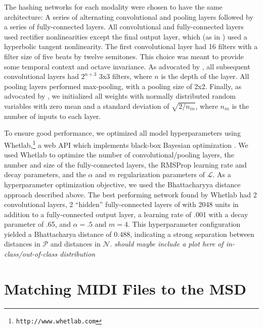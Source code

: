\documentclass{article}
\begin{document}
The hashing networks for each modality were chosen to have the same architecture: A series of alternating convolutional and pooling layers followed by a series of fully-connected layers.
All convolutional and fully-connected layers used rectifier nonlinearities except the final output layer, which (as in \cite{masci2014multimodal}) used a hyperbolic tangent nonlinearity.
The first convolutional layer had 16 filters with a filter size of five beats by twelve semitones.
This choice was meant to provide some temporal context and octave invariance.
As advocated by \cite{simonyan2014very}, all subsequent convolutional layers had $2^{n + 3}$ 3x3 filters, where $n$ is the depth of the layer.
All pooling layers performed max-pooling, with a pooling size of 2x2.
Finally, as advocated by \cite{he2015delving}, we initialized all weights with normally distributed random variables with zero mean and a standard deviation of $\sqrt{2/n_{in}}$, where $n_{in}$ is the number of inputs to each layer. 

To ensure good performance, we optimized all model hyperparameters using Whetlab,\footnote{\texttt{http://www.whetlab.com}} a web API which implements black-box Bayesian optimization \cite{snoek2012practical}.
We used Whetlab to optimize the number of convolutional/pooling layers, the number and size of the fully-connected layers, the RMSProp learning rate and decay parameters, and the $\alpha$ and $m$ regularization parameters of $\mathcal{L}$.
As a hyperparameter optimization objective, we used the Bhattacharyya distance approach described above.
The best performing network found by Whetlab had 2 convolutional layers, 2 ``hidden'' fully-connected layers of with 2048 units in addition to a fully-connected output layer, a learning rate of .001 with a decay parameter of .65, and $\alpha = .5$ and $m = 4$.
This hyperparameter configuration yielded a Bhattacharya distance of $0.488$, indicating a strong separation between distances in $\mathcal{P}$ and distances in $\mathcal{N}$.
\textit{should maybe include a plot here of in-class/out-of-class distribution}

\section{Matching MIDI Files to the MSD}
\label{sec:msd}
\end{document}
